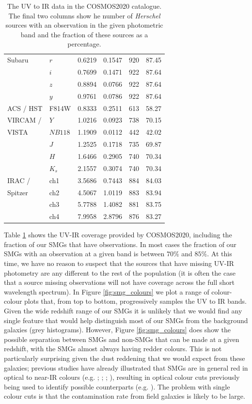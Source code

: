 \begin{table}
\begin{tabular}{p{4cm}|p{1.5cm}|p{2cm}|p{2cm}|p{1.5cm}|p{1.5cm}}
		Subaru & $r$ & 0.6219 & 0.1547 & 920 & 87.45 \\
		& $i$ & 0.7699 & 0.1471 & 922 & 87.64 \\
		& $z$ & 0.8894 & 0.0766 & 922 & 87.64 \\
		& $y$ & 0.9761 & 0.0786 & 922 & 87.64 \\
		\hline
		ACS / HST & F814W & 0.8333 & 0.2511 & 613 & 58.27 \\
		\hline
		VIRCAM / & $Y$ & 1.0216 & 0.0923 & 738 & 70.15 \\
		VISTA & $NB118$ & 1.1909 & 0.0112 & 442 & 42.02 \\
		& $J$ & 1.2525 & 0.1718 & 735 & 69.87 \\
		& $H$ & 1.6466 & 0.2905 & 740 & 70.34 \\
		& $K_s$ & 2.1557 & 0.3074 & 740 & 70.34 \\
		\hline
		IRAC / & ch1 & 3.5686 & 0.7443 & 884 & 84.03 \\
		Spitzer & ch2 & 4.5067 & 1.0119 & 883 & 83.94 \\
		& ch3 & 5.7788 & 1.4082 & 881 & 83.75 \\
		& ch4 & 7.9958 & 2.8796 & 876 & 83.27 \\
		\hline
		\hline
    \end{tabular}
    \caption{The UV to IR data in the COSMOS2020 catalogue. The final two columns show he number of \textit{Herschel} sources with an observation in the given photometric band and the fraction of these sources as a percentage.}
    \label{tab:smg_coverage}
\end{table}

Table \ref{tab:smg_coverage} shows the UV-IR coverage provided by COSMOS2020, including the fraction of our SMGs that have observations. In most cases the fraction of our SMGs with an observation at a given band is between $70\%$ and $85\%$. At this time, we have no reason to suspect that the sources that have missing UV-IR photometry are any different to the rest of the population (it is often the case that a source missing observations will not have coverage across the full short wavelength spectrum). In Figure \ref{fig:smg_colours} we plot a range of colour-colour plots that, from top to bottom, progressively samples the UV to IR bands. Given the wide redshift range of our SMGs it is unlikely that we would find any single feature that would help distinguish most of our SMGs from the background galaxies (grey histograms). However, Figure \ref{fig:smg_colours} does show the possible separation between SMGs and non-SMGs that can be made at a given redshift, with the SMGs almost always having redder colours. This is not particularly surprising given the dust reddening that we would expect from these galaxies; previous studies have already illustrated that SMGs are in general red in optical to near-IR colours (e.g. \citealt{Smail_2002}; \citealt{Dannerbauer_2004}; \citealt{Wang_2012}; \citealt{Chen_2016}), resulting in optical colour cuts previously being used to identify possible counterparts (e.g. \citealt{Michalowski_2012b}). The problem with single colour cuts is that the contamination rate from field galaxies is likely to be large.

